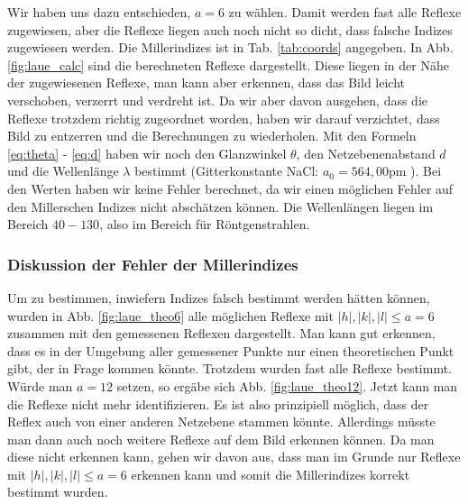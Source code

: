 Wir haben uns dazu entschieden, $a = 6$ zu wählen. Damit werden fast alle Reflexe zugewiesen, aber die Reflexe liegen auch noch nicht so dicht, dass falsche Indizes zugewiesen werden. Die Millerindizes ist in Tab. \ref{tab:coords} angegeben. In Abb. \ref{fig:laue_calc} sind die berechneten Reflexe dargestellt. Diese liegen in der Nähe der zugewiesenen Reflexe, man kann aber erkennen, dass das Bild leicht verschoben, verzerrt und verdreht ist. Da wir aber davon ausgehen, dass die Reflexe trotzdem richtig zugeordnet worden, haben wir darauf verzichtet, dass Bild zu entzerren und die Berechnungen zu wiederholen. Mit den Formeln \ref{eq:theta} - \ref{eq:d} haben wir noch den Glanzwinkel $\theta$, den Netzebenenabstand $d$ und die Wellenlänge $\lambda$ bestimmt (Gitterkonstante NaCl: $a_0 = 564,00 \si{\pico\meter}$ \cite{wiki_nacl}). Bei den Werten haben wir keine Fehler berechnet, da wir einen möglichen Fehler auf den Millerschen Indizes nicht abschätzen können. Die Wellenlängen liegen im Bereich $40 - 130$, also im Bereich für Röntgenstrahlen.

\subsubsection{Diskussion der Fehler der Millerindizes}
Um zu bestimmen, inwiefern Indizes falsch bestimmt werden hätten können, wurden in Abb. \ref{fig:laue_theo6} alle möglichen Reflexe mit $|h|,|k|,|l| \leq a = 6$ zusammen mit den gemessenen Reflexen dargestellt. Man kann gut erkennen, dass es in der Umgebung aller gemessener Punkte nur einen theoretischen Punkt gibt, der in Frage kommen könnte. Trotzdem wurden fast alle Reflexe bestimmt. Würde man $a = 12$ setzen, so ergäbe sich Abb. \ref{fig:laue_theo12}. Jetzt kann man die Reflexe nicht mehr identifizieren. Es ist also prinzipiell möglich, dass der Reflex auch von einer anderen Netzebene stammen könnte. Allerdings müsste man dann auch noch weitere Reflexe auf dem Bild erkennen können. Da man diese nicht erkennen kann, gehen wir davon aus, dass man im Grunde nur Reflexe mit $|h|,|k|,|l| \leq a = 6$ erkennen kann und somit die Millerindizes korrekt bestimmt wurden.

